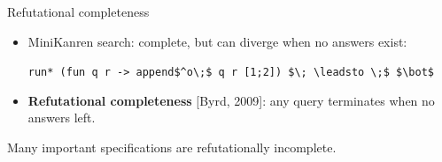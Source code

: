 \documentclass[final,20pt]{beamer}
\newcommand\NoIndent[1]{%
  \begingroup
  \par
  \parshape0
  #1\par
  \endgroup
}
\begin{document}
\begin{frame}[t]
\begin{columns}[t]
\begin{column}{\onecolwid}
    
    \begin{block}{Refutational completeness}
    \vskip7mm

      \begin{itemize}
        \item MiniKanren search: complete, but can diverge when no answers exist:
      \vskip8mm

            
       \NoIndent{
           \lstinline|run* (fun q r -> append$^o\;$ q r [1;2]) $\; \leadsto \;$ $\bot$|
       }
       \vskip8mm
       \item \textbf{Refutational completeness} [Byrd, 2009]: any query terminates when no answers left.
       \end{itemize}
       \vskip1cm
      
       
       \large Many important specifications are refutationally incomplete.
       \vskip1cm
       
       
    \end{block}
    
  

\end{column}
\end{columns}
\end{frame}
\end{document}
